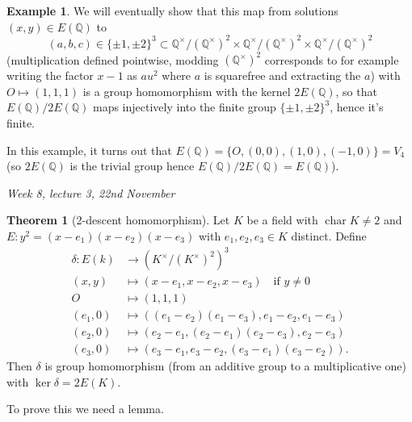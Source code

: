 \documentclass{article}
\newcommand{\Q}{\mathbb{Q}}
\newcommand{\Char}{\operatorname{char}}
\theoremstyle{definition}
\newtheorem{thm}[defn]{Theorem}
\newtheorem{example}[defn]{Example}
\begin{document}
\begin{example}
We will eventually show that this map from solutions $(x,y)\in E(\Q)$ to
\[
(a,b,c)\in\{\pm 1,\pm 2\}^3\subset \Q^\times/(\Q^\times)^2\times \Q^\times/(\Q^\times)^2\times \Q^\times/(\Q^\times)^2
\]
(multiplication defined pointwise, modding $(\Q^\times)^2$ corresponds to for example writing the factor $x-1$ as $au^2$ where $a$ is squarefree and extracting the $a$) with $O\mapsto (1,1,1)$ is a group homomorphism with the kernel $2E(\Q)$, so that $E(\Q)/2E(\Q)$ maps injectively into the finite group $\{\pm 1,\pm 2\}^3$, hence it's finite.

In this example, it turns out that $E(\Q)=\{O,(0,0),(1,0),(-1,0)\}=V_4$ (so $2E(\Q)$ is the trivial group hence $E(\Q)/2E(\Q)=E(\Q)$).
\end{example}

\begin{flushright}
\textit{Week 8, lecture 3, 22nd November}
\end{flushright}

\begin{thm}[2-descent homomorphism]
\label{thm:deltahom}
Let $K$ be a field with $\Char K\neq 2$ and $E:y^2=(x-e_1)(x-e_2)(x-e_3)$ with $e_1,e_2,e_3\in K$ distinct. Define
\[
\begin{aligned}
\delta:E(k)&\rightarrow \left(K^\times/(K^\times)^2\right)^3 \\
(x,y)&\mapsto (x-e_1,x-e_2,x-e_3)\quad \text{if }y\neq 0 \\
O&\mapsto (1,1,1) \\
(e_1,0)&\mapsto ((e_1-e_2)(e_1-e_3),e_1-e_2,e_1-e_3) \\
(e_2,0)&\mapsto (e_2-e_1,(e_2-e_1)(e_2-e_3),e_2-e_3) \\
(e_3,0)&\mapsto (e_3-e_1,e_3-e_2,(e_3-e_1)(e_3-e_2)).
\end{aligned}
\]
Then $\delta$ is group homomorphism (from an additive group to a multiplicative one) with $\ker\delta=2E(K)$.
\end{thm}

To prove this we need a lemma.
\end{document}

